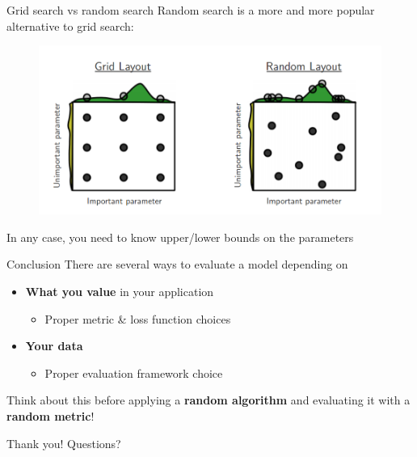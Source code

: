 \documentclass{beamer}
\newcommand{\1}[1]{\mathbbm{1}\left[#1\right]}
\begin{document}
\begin{frame}{Grid search vs random search}
Random search is a more and more popular alternative to grid search:
\vfill
\pause
\begin{figure}
\centering
\includegraphics[width=\textwidth]{images/random_search.png}
\end{figure}
\pause
\vfill
In any case, you need to know upper/lower bounds on the parameters
\end{frame}

\begin{frame}{Conclusion}
There are several ways to evaluate a model depending on
\begin{itemize}
	\item \textbf{What you value} in your application
	\begin{itemize}
		\item Proper metric \& loss function choices
	\end{itemize}
	\item \textbf{Your data}
	\begin{itemize}
		\item Proper evaluation framework choice
	\end{itemize}
\end{itemize}
\vfill
\pause
Think about this before applying a \textbf{random algorithm} and evaluating it with a \textbf{random metric}!
\end{frame}

\begin{frame}
	\center
	\huge{Thank you! Questions?}
\end{frame}
\end{document}
